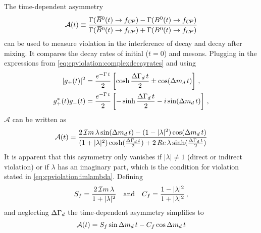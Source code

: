 The time-dependent asymmetry
\begin{equation}
  {\mathcal A}(t) \equiv
    \frac{\Gamma({{\kern 0.18em\overline{\kern -0.18em B}{}}{}^0}(t) \rightarrow f_{{C\!P}}) - \Gamma({{B}^0}(t) \rightarrow f_{{C\!P}})}
         {\Gamma({{\kern 0.18em\overline{\kern -0.18em B}{}}{}^0}(t) \rightarrow f_{{C\!P}}) + \Gamma({{B}^0}(t) \rightarrow f_{{C\!P}})}
\label{eq:cpviolation:asymmetry}
\end{equation}
can be used to measure \CP violation in the interference of decay and decay
after mixing. It compares the decay rates of initial ($t = 0$) \Bdb and \Bd
mesons. Plugging in the expressions from
\cref{eq:cpviolation:complexdecayrates} and using
\begin{align}
\begin{split}
  |g_{\pm}(t)|^2 &= \frac{e^{-\Gamma\,t}}{2}\left[\cosh\frac{{\Delta\Gamma_{{d}}}\,t}{2} \pm \cos({\Delta m_{{d}}}\,t)\right]\,,\\
  g_+^{\ast}(t)g_-(t) &= \frac{e^{-\Gamma\,t}}{2} \left[-\sinh\frac{{\Delta\Gamma_{{d}}}\,t}{2} - i \sin({\Delta m_{{d}}}\,t)\right]\,,
\end{split}
\end{align}
$\mathcal{A}$ can be written as
\begin{align}
  \mathcal{A}(t) = \frac{2\,\mathcal{I}m\,\lambda \sin({\Delta m_{{d}}}\,t) - (1 - |\lambda|^2)\cos({\Delta m_{{d}}}\,t)}{(1 + |\lambda|^2)\cosh(\frac{{\Delta\Gamma_{{d}}}\,t}{2}) + 2\,Re\,\lambda \sinh(\frac{{\Delta\Gamma_{{d}}}\,t}{2})}
\end{align}
It is apparent that this asymmetry only vanishes if $|\lambda| \neq 1$ (direct
or indirect \CP violation) or if $\lambda$ has an imaginary part, which is the
condition for \CP violation stated in \cref{eq:cpviolation:imlambda}. Defining
\begin{align}
  S_{f} = \frac{2\,\mathcal{I}m\,\lambda}{1 + |\lambda|^2} \quad \text{and} \quad C_{f} = \frac{1 - |\lambda|^2}{1 + |\lambda|^2}\,,
\end{align}
and neglecting ${\Delta\Gamma_{{d}}}$ the time-dependent asymmetry simplifies to
\begin{equation}
  \mathcal{A}(t) = S_{f}\sin{\ensuremath{\Delta m_{{d}}}}\,t - C_{f}\cos{\ensuremath{\Delta m_{{d}}}}\,t
\label{eq:cpviolation:simpleasymmetry}
\end{equation}
